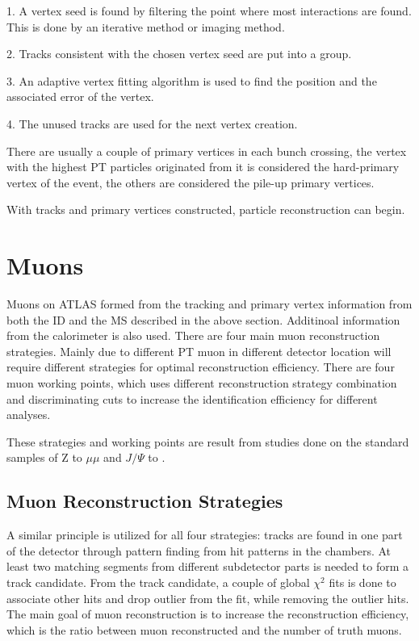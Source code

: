 1. A vertex seed is found by filtering the point where most interactions are found. This is done by an iterative method or imaging method.  

2. Tracks consistent with the chosen vertex seed are put into a group.

3. An adaptive vertex fitting algorithm is used to find the position and the associated error of the vertex. 

4. The unused tracks are used for the next vertex creation. 

There are usually a couple of primary vertices in each bunch crossing, the vertex with the highest PT particles originated from it is considered the hard-primary vertex of the event, the others are considered the pile-up primary vertices. 

With tracks and primary vertices constructed, particle reconstruction can begin. 


\section{Muons}
Muons on ATLAS formed from the tracking and primary vertex information from both the ID and the MS described in the above section. Additinoal information from the calorimeter is also used. There are four main muon reconstruction strategies. Mainly due to different PT muon in different detector location will require different strategies for optimal reconstruction efficiency. There are four muon working points, which uses different reconstruction strategy combination and discriminating cuts to
increase the identification efficiency for different analyses.

These strategies and working points are result from studies done on the standard samples of Z to $\mu \mu $ and $J/\Psi$ to \mu \mu. 

\subsection*{Muon Reconstruction Strategies}
A similar principle is utilized for all four strategies: tracks are found in one part of the detector through pattern finding from hit patterns in the chambers. At least two matching segments from different subdetector parts is needed to form a track candidate. From the track candidate, a couple of global $\chi^{2}$ fits is done to associate other hits and drop outlier from the fit, while removing the outlier hits. The main goal of muon reconstruction is to increase the
reconstruction efficiency, which is the ratio between muon reconstructed and the number of truth muons. 


